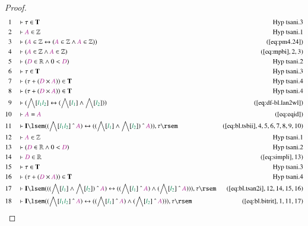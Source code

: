 \begin{proof}
\begin{align}
  1 &&  & \vdash \tau \in \mathbf{T}&\text{Hyp~tsani.3}\notag%
  \\ 2 &&  & \vdash \mc{A} \in \mathbb{Z}&\text{Hyp~tsani.1}\notag%
  \\ 3 &&  & \vdash ( \mc{A} \in \mathbb{Z} \leftrightarrow ( \mc{A} \in
      \mathbb{Z} \wedge \mc{A} \in \mathbb{Z} )
      )&(\mbox{\ref{eq:pm4.24}})\notag
  \\ 4 &&  & \vdash ( \mc{A} \in \mathbb{Z} \wedge \mc{A} \in \mathbb{Z}
      )&(\mbox{\ref{eq:mpbi}},2,3)\notag
  \\ 5 &&  & \vdash ( \mc{D} \in \mathbb{R} \wedge 0 < \mc{D}
      )&\text{Hyp~tsani.2}\notag%
  \\ 6 &&  & \vdash \tau \in \mathbf{T}&\text{Hyp~tsani.3}\notag%
  \\ 7 &&  & \vdash ( \tau + ( \mc{D} \times \mc{A} ) ) \in
      \mathbf{T}&\text{Hyp~tsani.4}\notag%
  \\ 8 &&  & \vdash ( \tau + ( \mc{D} \times \mc{A} ) ) \in
      \mathbf{T}&\text{Hyp~tsani.4}\notag%
  \\ 9 &&  & \vdash ( \bigwedge[ \mwl{l_1} \mwl{l_2} ] \leftrightarrow (
      \bigwedge[ \mwl{l_1} ] \wedge \bigwedge[ \mwl{l_2} ]
      ) )&(\mbox{\ref{eq:df-bl.lan2wl}})\notag
  \\ 10 &&  & \vdash \mc{A} = \mc{A}&(\mbox{\ref{eq:eqid}})\notag
  \\ 11 &&  & \vdash \mathbf{I} \lsem ( ( \bigwedge[ \mwl{l_1} \mwl{l_2} ]
      ~\string^~ \mc{A} ) \leftrightarrow ( ( \bigwedge[
      \mwl{l_1} ] \wedge \bigwedge[ \mwl{l_2} ] )
      ~\string^~ \mc{A} ) ) , \tau
      \rsem&(\mbox{\ref{eq:bl.tsbii}},4,5,6,7,8,9,10)\notag
  \\ 12 &&  & \vdash \mc{A} \in \mathbb{Z}&\text{Hyp~tsani.1}\notag%
  \\ 13 &&  & \vdash ( \mc{D} \in \mathbb{R} \wedge 0 < \mc{D}
      )&\text{Hyp~tsani.2}\notag%
  \\ 14 &&  & \vdash \mc{D} \in \mathbb{R}&(\mbox{\ref{eq:simpli}},13)\notag
  \\ 15 &&  & \vdash \tau \in \mathbf{T}&\text{Hyp~tsani.3}\notag%
  \\ 16 &&  & \vdash ( \tau + ( \mc{D} \times \mc{A} ) ) \in
      \mathbf{T}&\text{Hyp~tsani.4}\notag%
  \\ 17 &&  & \vdash \mathbf{I} \lsem ( ( ( \bigwedge[ \mwl{l_1} ] \wedge
      \bigwedge[ \mwl{l_2} ] ) ~\string^~ \mc{A} )
      \leftrightarrow ( ( \bigwedge[ \mwl{l_1} ] ~\string^~
      \mc{A} ) \wedge ( \bigwedge[ \mwl{l_2} ] ~\string^~
      \mc{A} ) ) ) , \tau
      \rsem&(\mbox{\ref{eq:bl.tsan2i}},12,14,15,16)\notag
  \\ 18 &&  & \vdash \mathbf{I} \lsem ( ( \bigwedge[ \mwl{l_1} \mwl{l_2} ]
      ~\string^~ \mc{A} ) \leftrightarrow ( ( \bigwedge[
      \mwl{l_1} ] ~\string^~ \mc{A} ) \wedge ( \bigwedge[
      \mwl{l_2} ] ~\string^~ \mc{A} ) ) ) , \tau
      \rsem&(\mbox{\ref{eq:bl.bitrit}},1,11,17)\notag
\end{align}
\end{proof}

